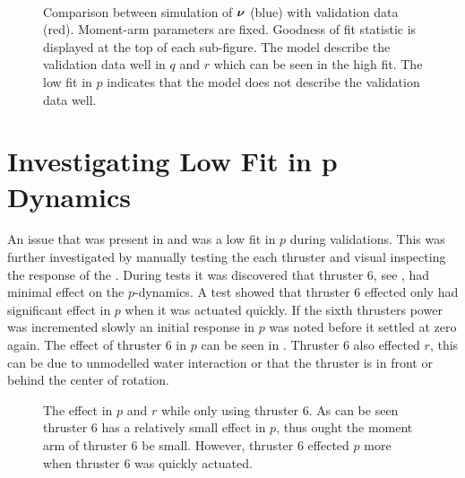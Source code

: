 \begin{figure}[tbp]
  \centering
  \qquad
  \\
  \caption{\label{fig:ResultKalmanFixedMomentArms}%
    Comparison between simulation of $\boldsymbol{\nu}$ (blue) with validation data (red). Moment-arm parameters are fixed. Goodness of fit statistic is displayed at the top of each sub-figure. The model describe the validation data well in $q$ and $r$ which can be seen in the high fit. The low fit in $p$ indicates that the model does not describe the validation data well.}
\end{figure}


\section{Investigating Low Fit in p Dynamics}
An issue that was present in  and  was a low fit in $p$ during validations. This was further investigated by manually testing the each thruster and visual inspecting the response of the \abbrROV. During tests it was discovered that thruster 6, see , had minimal effect on the $p$-dynamics. A test showed that thruster 6 effected only had significant effect in $p$ when it was actuated quickly. If the sixth thrusters power was incremented slowly an initial response in $p$ was noted before it settled at zero again. The effect of thruster 6 in $p$ can be seen in . Thruster 6 also effected $r$, this can be due to unmodelled water interaction or that the thruster is in front or behind the center of rotation.

\begin{figure}
\centering
  \qquad
  \qquad
  \caption{\label{fig:thruster6}%
  The effect in $p$ and $r$ while only using thruster 6. As can be seen thruster 6 has a relatively small effect in $p$, thus ought the moment arm of thruster 6 be small. However, thruster 6 effected $p$ more when thruster 6 was quickly actuated.}
\end{figure}


